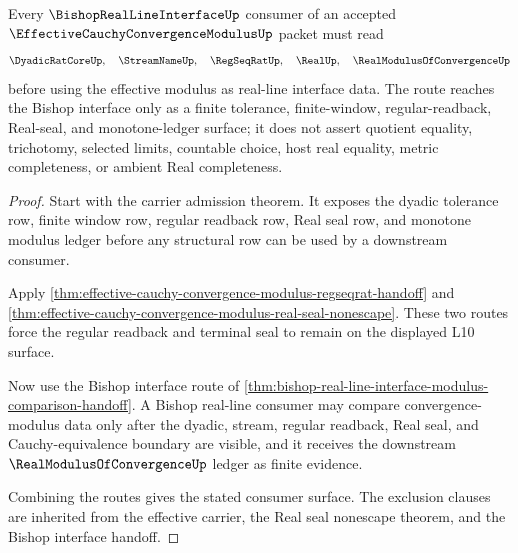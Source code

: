 \begin{theorem}
\label{thm:effective-cauchy-convergence-modulus-bishop-interface-consumer-route}
Every $\BishopRealLineInterfaceUp$ consumer of an accepted $\EffectiveCauchyConvergenceModulusUp$ packet must read
$$
\DyadicRatCoreUp,\quad \StreamNameUp,\quad \RegSeqRatUp,\quad \RealUp,\quad \RealModulusOfConvergenceUp
$$
before using the effective modulus as real-line interface data. The route reaches the Bishop interface only as a finite tolerance, finite-window, regular-readback, Real-seal, and monotone-ledger surface; it does not assert quotient equality, trichotomy, selected limits, countable choice, host real equality, metric completeness, or ambient Real completeness.
\end{theorem}
\begin{proof}
Start with the carrier admission theorem. It exposes the dyadic tolerance row, finite window row, regular readback row, Real seal row, and monotone modulus ledger before any structural row can be used by a downstream consumer.

Apply \autoref{thm:effective-cauchy-convergence-modulus-regseqrat-handoff} and \autoref{thm:effective-cauchy-convergence-modulus-real-seal-nonescape}. These two routes force the regular readback and terminal seal to remain on the displayed L10 surface.

Now use the Bishop interface route of \autoref{thm:bishop-real-line-interface-modulus-comparison-handoff}. A Bishop real-line consumer may compare convergence-modulus data only after the dyadic, stream, regular readback, Real seal, and Cauchy-equivalence boundary are visible, and it receives the downstream $\RealModulusOfConvergenceUp$ ledger as finite evidence.

Combining the routes gives the stated consumer surface. The exclusion clauses are inherited from the effective carrier, the Real seal nonescape theorem, and the Bishop interface handoff.
\end{proof}


